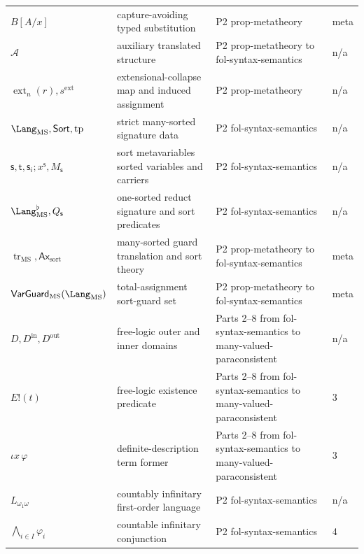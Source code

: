 \begin{longtable}{@{}p{}p{}p{}p{}@{}}
\(B[A/x]\) & capture-avoiding typed substitution & P2 prop-\allowbreak{}metatheory & meta \\
\(\mathcal A\) & auxiliary translated structure & P2 prop-\allowbreak{}metatheory to fol-\allowbreak{}syntax-\allowbreak{}semantics & n/a \\
\(\operatorname{ext}_n(r),\allowbreak s^{\mathrm{ext}}\) & extensional-collapse map and induced assignment & P2 prop-\allowbreak{}metatheory & n/a \\
\(\Lang_{\mathrm{MS}},\allowbreak \mathsf{Sort},\allowbreak \operatorname{tp}\) & strict many-sorted signature data & P2 fol-\allowbreak{}syntax-\allowbreak{}semantics & n/a \\
\(\mathsf s,\allowbreak \mathsf t,\allowbreak \mathsf s_i;\allowbreak x^{\mathsf s},\allowbreak M_{\mathsf s}\) & sort metavariables sorted variables and carriers & P2 fol-\allowbreak{}syntax-\allowbreak{}semantics & n/a \\
\(\Lang_{\mathrm{MS}}^{\flat},\allowbreak Q_{\mathsf s}\) & one-sorted reduct signature and sort predicates & P2 fol-\allowbreak{}syntax-\allowbreak{}semantics & n/a \\
\(\operatorname{tr}_{\mathrm{MS}},\allowbreak \mathsf{Ax}_{\mathrm{sort}}\) & many-sorted guard translation and sort theory & P2 prop-\allowbreak{}metatheory to fol-\allowbreak{}syntax-\allowbreak{}semantics & meta \\
\(\mathsf{VarGuard}_{\mathrm{MS}}(\Lang_{\mathrm{MS}})\) & total-assignment sort-guard set & P2 prop-\allowbreak{}metatheory to fol-\allowbreak{}syntax-\allowbreak{}semantics & meta \\
\(D,\allowbreak D^{\mathrm{in}},\allowbreak D^{\mathrm{out}}\) & free-logic outer and inner domains & Parts 2--8 from fol-\allowbreak{}syntax-\allowbreak{}semantics to many-\allowbreak{}valued-\allowbreak{}paraconsistent & n/a \\
\(E!(t)\) & free-logic existence predicate & Parts 2--8 from fol-\allowbreak{}syntax-\allowbreak{}semantics to many-\allowbreak{}valued-\allowbreak{}paraconsistent & 3 \\
\(\iota x\,\varphi\) & definite-description term former & Parts 2--8 from fol-\allowbreak{}syntax-\allowbreak{}semantics to many-\allowbreak{}valued-\allowbreak{}paraconsistent & 3 \\
\(L_{\omega_1\omega}\) & countably infinitary first-order language & P2 fol-\allowbreak{}syntax-\allowbreak{}semantics & n/a \\
\(\bigwedge_{i\in I}\varphi_i\) & countable infinitary conjunction & P2 fol-\allowbreak{}syntax-\allowbreak{}semantics & 4 \\

\end{longtable}
